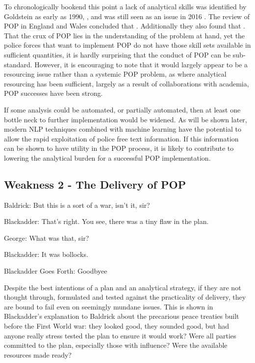 To chronologically bookend this point a lack of analytical skills was identified by Goldstein as early as 1990, \parencite{goldstein1990}, and was still seen as an issue in 2016 \parencite{popchap11}. The review of POP in England and Wales \parencite{POPUCL} concluded that . Additionally they also found that . That the crux of POP lies in the understanding of the problem at hand, yet the police forces that want to implement POP do not have those skill sets available in sufficient quantities, it is hardly surprising that the conduct of POP can be sub-standard. However, it is encouraging to note that it would largely appear to be a resourcing issue rather than a systemic POP problem, as where analytical resourcing has been sufficient, largely as a result of collaborations with academia, POP successes have been strong.

If some analysis could be automated, or partially automated, then at least one bottle neck to further implementation would be widened. As will be shown later, modern NLP techniques combined with machine learning have the potential to allow the rapid exploitation of police free text information. If this information can be shown to have utility in the POP process, it is likely to contribute to lowering the analytical burden for a successful POP implementation.


\subsection{Weakness 2 - The Delivery of POP}


\epigraph{\centering Baldrick:  But this is a sort of a war, isn't it, sir?
 
Blackadder: That's right.  You see, there was a tiny flaw in the plan.
 
George:   What was that, sir?
 
Blackadder:  It was bollocks.}{Blackadder Goes Forth: Goodbyee }

Despite the best intentions of a plan and an analytical strategy, if they are not thought through, formulated and tested against the practicality of delivery, they are bound to fail even on seemingly mundane issues. This is shown in Blackadder’s explanation to Baldrick about the precarious peace treaties built before the First World war: they looked good, they sounded good, but had anyone really stress tested the plan to ensure it would work? Were all parties committed to the plan, especially those with influence? Were the available resources made ready?

